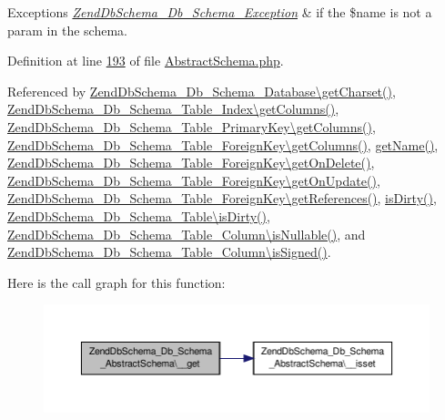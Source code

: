 \begin{DoxyExceptions}{Exceptions}
{\em \hyperlink{classZendDbSchema__Db__Schema__Exception}{Zend\-Db\-Schema\-\_\-\-Db\-\_\-\-Schema\-\_\-\-Exception}} & if the \$name is not a param in the schema. \\
\hline
\end{DoxyExceptions}


Definition at line \hyperlink{AbstractSchema_8php_source_l00193}{193} of file \hyperlink{AbstractSchema_8php_source}{Abstract\-Schema.\-php}.



Referenced by \hyperlink{Database_8php_source_l00134}{Zend\-Db\-Schema\-\_\-\-Db\-\_\-\-Schema\-\_\-\-Database\textbackslash{}get\-Charset()}, \hyperlink{Db_2Schema_2Table_2Index_8php_source_l00113}{Zend\-Db\-Schema\-\_\-\-Db\-\_\-\-Schema\-\_\-\-Table\-\_\-\-Index\textbackslash{}get\-Columns()}, \hyperlink{PrimaryKey_8php_source_l00122}{Zend\-Db\-Schema\-\_\-\-Db\-\_\-\-Schema\-\_\-\-Table\-\_\-\-Primary\-Key\textbackslash{}get\-Columns()}, \hyperlink{ForeignKey_8php_source_l00157}{Zend\-Db\-Schema\-\_\-\-Db\-\_\-\-Schema\-\_\-\-Table\-\_\-\-Foreign\-Key\textbackslash{}get\-Columns()}, \hyperlink{AbstractSchema_8php_source_l00304}{get\-Name()}, \hyperlink{ForeignKey_8php_source_l00197}{Zend\-Db\-Schema\-\_\-\-Db\-\_\-\-Schema\-\_\-\-Table\-\_\-\-Foreign\-Key\textbackslash{}get\-On\-Delete()}, \hyperlink{ForeignKey_8php_source_l00220}{Zend\-Db\-Schema\-\_\-\-Db\-\_\-\-Schema\-\_\-\-Table\-\_\-\-Foreign\-Key\textbackslash{}get\-On\-Update()}, \hyperlink{ForeignKey_8php_source_l00096}{Zend\-Db\-Schema\-\_\-\-Db\-\_\-\-Schema\-\_\-\-Table\-\_\-\-Foreign\-Key\textbackslash{}get\-References()}, \hyperlink{AbstractSchema_8php_source_l00091}{is\-Dirty()}, \hyperlink{Table_8php_source_l00365}{Zend\-Db\-Schema\-\_\-\-Db\-\_\-\-Schema\-\_\-\-Table\textbackslash{}is\-Dirty()}, \hyperlink{Db_2Schema_2Table_2Column_8php_source_l00083}{Zend\-Db\-Schema\-\_\-\-Db\-\_\-\-Schema\-\_\-\-Table\-\_\-\-Column\textbackslash{}is\-Nullable()}, and \hyperlink{Db_2Schema_2Table_2Column_8php_source_l00093}{Zend\-Db\-Schema\-\_\-\-Db\-\_\-\-Schema\-\_\-\-Table\-\_\-\-Column\textbackslash{}is\-Signed()}.



Here is the call graph for this function\-:\nopagebreak
\begin{figure}[H]
\begin{center}
\leavevmode
\includegraphics[width=350pt]{classZendDbSchema__Db__Schema__AbstractSchema_a54d32c6f15463eaad2321a9f0e7225d7_cgraph}
\end{center}
\end{figure}




